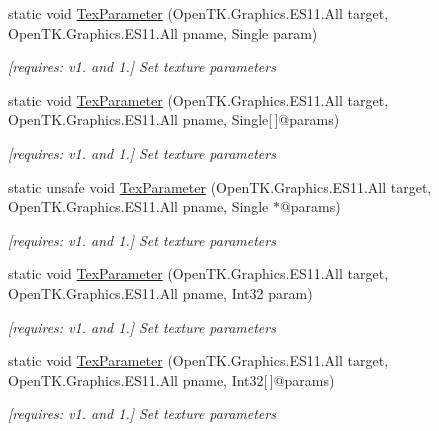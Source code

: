 \begin{DoxyCompactItemize}
static void \hyperlink{class_open_t_k_1_1_graphics_1_1_e_s11_1_1_g_l_a87b54c2841c667cd3c91dcec2618f97c}{Tex\-Parameter} (Open\-T\-K.\-Graphics.\-E\-S11.\-All target, Open\-T\-K.\-Graphics.\-E\-S11.\-All pname, Single param)
\begin{DoxyCompactList}\small\item\em \mbox{[}requires\-: v1. and 1.\mbox{]} Set texture parameters \end{DoxyCompactList}\item 
static void \hyperlink{class_open_t_k_1_1_graphics_1_1_e_s11_1_1_g_l_a58847ce8698ab0d1f94260abd0415fea}{Tex\-Parameter} (Open\-T\-K.\-Graphics.\-E\-S11.\-All target, Open\-T\-K.\-Graphics.\-E\-S11.\-All pname, Single\mbox{[}$\,$\mbox{]}@params)
\begin{DoxyCompactList}\small\item\em \mbox{[}requires\-: v1. and 1.\mbox{]} Set texture parameters \end{DoxyCompactList}\item 
static unsafe void \hyperlink{class_open_t_k_1_1_graphics_1_1_e_s11_1_1_g_l_a064f3ec086c1fdb64de8c6c985de0064}{Tex\-Parameter} (Open\-T\-K.\-Graphics.\-E\-S11.\-All target, Open\-T\-K.\-Graphics.\-E\-S11.\-All pname, Single $\ast$@params)
\begin{DoxyCompactList}\small\item\em \mbox{[}requires\-: v1. and 1.\mbox{]} Set texture parameters \end{DoxyCompactList}\item 
static void \hyperlink{class_open_t_k_1_1_graphics_1_1_e_s11_1_1_g_l_ae2b292e2b3daff9336ffea8288b92c52}{Tex\-Parameter} (Open\-T\-K.\-Graphics.\-E\-S11.\-All target, Open\-T\-K.\-Graphics.\-E\-S11.\-All pname, Int32 param)
\begin{DoxyCompactList}\small\item\em \mbox{[}requires\-: v1. and 1.\mbox{]} Set texture parameters \end{DoxyCompactList}\item 
static void \hyperlink{class_open_t_k_1_1_graphics_1_1_e_s11_1_1_g_l_afcdd9637ffe595ba78de5e18b53c888d}{Tex\-Parameter} (Open\-T\-K.\-Graphics.\-E\-S11.\-All target, Open\-T\-K.\-Graphics.\-E\-S11.\-All pname, Int32\mbox{[}$\,$\mbox{]}@params)
\begin{DoxyCompactList}\small\item\em \mbox{[}requires\-: v1. and 1.\mbox{]} Set texture parameters \end{DoxyCompactList}\item 

\end{DoxyCompactItemize}
